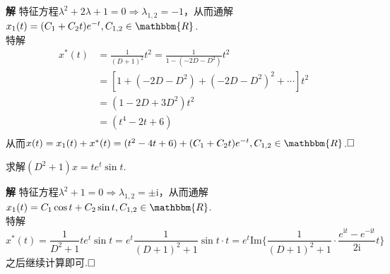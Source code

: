 \documentclass{ctexart}
\newenvironment{custom}[1]{\par\noindent \textbf{#1}\quad}{\par\vspace{1em}}
\begin{document}
\begin{custom}{解}
特征方程$\lambda^{2}+2\lambda+1=0\Rightarrow \lambda_{1,2}=-1$，从而通解$x_{1}(t)=(C_{1}+C_{2}t)e^{-t},C_{1,2}\in\mathbbm{R}$.\\
特解
$$\begin{aligned}x^{*}(t)&=\frac{1}{(D+1)^{2}}t^{2}=\frac{1}{1-(-2D-D^{2})}t^{2}\\&=[1+(-2D-D^{2})+(-2D-D^{2})^{2}+\cdots]t^{2}\\&=(1-2D+3D^{2})t^{2}\\&=(t^{4}-2t+6)\\\end{aligned}$$
从而$x(t)=x_{1}(t)+x^{*}(t)=(t^{2}-4t+6)+(C_{1}+C_{2}t)e^{-t},C_{1,2}\in\mathbbm{R}$.$\hfill{\square}$
\end{custom}

\begin{example}
求解$(D^{2}+1)x=te^{t}\sin{t}$.
\end{example}

\begin{custom}{解}
特征方程$\lambda^{2}+1=0\Rightarrow\lambda_{1,2}=\pm\mathrm{i}$，从而通解$x_{1}(t)=C_{1}\cos{t}+C_{2}\sin{t},C_{1,2}\in\mathbbm{R}$.\\
特解
$$x^{*}(t)=\frac{1}{D^{2}+1}te^{t}\sin{t}=e^{t}\frac{1}{(D+1)^{2}+1}\sin{t}\cdot t=e^{t}\mathrm{Im}\{\frac{1}{(D+1)^{2}+1}\cdot\frac{e^{\mathrm{i}t}-e^{-\mathrm{i}t}}{2\mathrm{i}}t\}$$
之后继续计算即可.$\hfill{\square}$
\end{custom}
\end{document}
